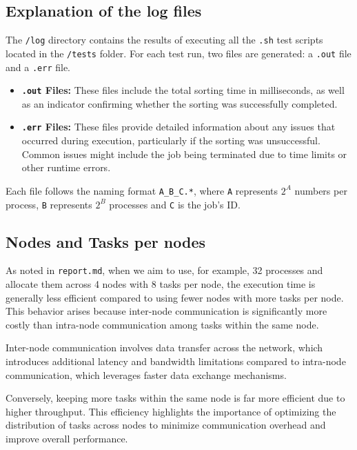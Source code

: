 \documentclass[12pt]{article}
\begin{document}
\subsection{Explanation of the log files}

The \texttt{/log} directory contains the results of executing all the \texttt{.sh} test scripts located in the \texttt{/tests} folder. For each test run, two files are generated: a \texttt{.out} file and a \texttt{.err} file.  

\vspace{-10pt}

\begin{itemize}[noitemsep]
    \item \textbf{\texttt{.out} Files:} These files include the total sorting time in milliseconds, as well as an indicator confirming whether the sorting was successfully completed.  

    \item \textbf{\texttt{.err} Files:} These files provide detailed information about any issues that occurred during execution, particularly if the sorting was unsuccessful. Common issues might include the job being terminated due to time limits or other runtime errors.
\end{itemize}

\vspace{-10pt}

Each file follows the naming format \texttt{A\_B\_C.*}, where \texttt{A} represents $2^A$ numbers per process, \texttt{B} represents $2^B$ processes and \texttt{C} is the job's ID.


\subsection{Nodes and Tasks per nodes}

As noted in \texttt{report.md}, when we aim to use, for example, 32 processes and allocate them across 4 nodes with 8 tasks per node, the execution time is generally less efficient compared to using fewer nodes with more tasks per node. This behavior arises because inter-node communication is significantly more costly than intra-node communication among tasks within the same node.

Inter-node communication involves data transfer across the network, which introduces additional latency and bandwidth limitations compared to intra-node communication, which leverages faster data exchange mechanisms.

Conversely, keeping more tasks within the same node is far more efficient due to higher throughput. This efficiency highlights the importance of optimizing the distribution of tasks across nodes to minimize communication overhead and improve overall performance.



\newpage
\end{document}
